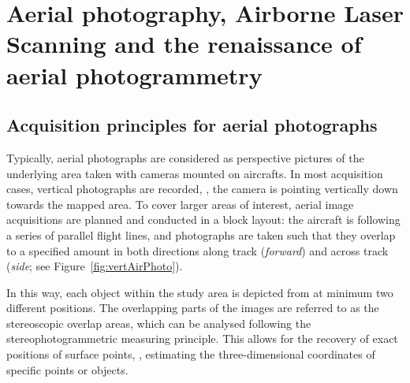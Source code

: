 \section[Airphotos, ALS and aerial photogrammetry]{Aerial photography, 
	Airborne Laser Scanning and the renaissance of aerial photogrammetry}\label{sec:AerialPhotogrammetry}

\subsection{Acquisition principles for aerial photographs}

Typically,  aerial photographs
are considered as perspective pictures of the underlying area taken with cameras mounted on aircrafts.
In most acquisition cases, vertical photographs are recorded, \ie, the camera is pointing vertically down towards the mapped area.
To cover larger areas of interest, aerial image acquisitions are planned and conducted in a block layout:
the aircraft is following a series of parallel flight lines, and photographs are taken such that they overlap to a specified amount in both directions 
along track (\emph{forward}) and across track (\emph{side}; see Figure~\ref{fig:vertAirPhoto}).

In this way,  
each object within the study area is depicted from at minimum two different positions.
The overlapping parts of the images are referred to as the stereoscopic overlap areas, 
which can be analysed following the stereophotogrammetric measuring principle. This allows for 
the recovery of exact positions of surface points, \ie, estimating the three-dimensional coordinates of specific points or objects. 

